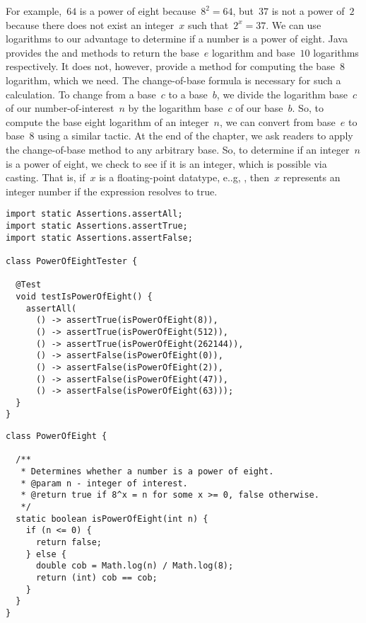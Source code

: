 For example,~$64$ is a power of eight because~$8^2=64$, but~$37$ is not a power of~$2$ because there does not exist an integer~$x$ such that~$2^x=37$.
We can use logarithms to our advantage to determine if a number is a power of eight.
Java provides the  and  methods to return the base~$e$ logarithm and base~$10$ logarithms respectively.
It does not, however, provide a method for computing the base~$8$ logarithm, which we need.
The change-of-base formula is necessary for such a calculation.
To change from a base~$c$ to a base~$b$, we divide the logarithm base~$c$ of our number-of-interest~$n$ by the logarithm base~$c$ of our base~$b$.
So, to compute the base eight logarithm of an integer~$n$, we can convert from base~$e$ to base~$8$ using a similar tactic.
At the end of the chapter, we ask readers to apply the change-of-base method to any arbitrary base.
So, to determine if an integer~$n$ is a power of eight, we check to see if it is an integer, which is possible via casting. 
That is, if~$x$ is a floating-point datatype, e..g, , then~$x$ represents an integer number if the expression  resolves to true.

\begin{lstlisting}[language=MyJava]
import static Assertions.assertAll;
import static Assertions.assertTrue;
import static Assertions.assertFalse;

class PowerOfEightTester {

  @Test
  void testIsPowerOfEight() {
    assertAll(
      () -> assertTrue(isPowerOfEight(8)),
      () -> assertTrue(isPowerOfEight(512)),
      () -> assertTrue(isPowerOfEight(262144)),
      () -> assertFalse(isPowerOfEight(0)),
      () -> assertFalse(isPowerOfEight(2)),
      () -> assertFalse(isPowerOfEight(47)),
      () -> assertFalse(isPowerOfEight(63)));
  }
}
\end{lstlisting}

\begin{lstlisting}[language=MyJava]
class PowerOfEight {

  /**
   * Determines whether a number is a power of eight.
   * @param n - integer of interest.
   * @return true if 8^x = n for some x >= 0, false otherwise.
   */
  static boolean isPowerOfEight(int n) {
    if (n <= 0) {
      return false;
    } else {
      double cob = Math.log(n) / Math.log(8);
      return (int) cob == cob;
    }
  }
}
\end{lstlisting}


